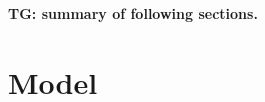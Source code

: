 \documentclass{llncs}
\newcommand{\TG}[1]{{\color{blue}\textbf{TG: #1}}}
\newcommand{\CD}[1]{{\color{green}\textbf{CD: #1}}}
\begin{document}
%
%
%
%
%
\TG{summary of following sections.}



\section{Model} %
\end{document}
